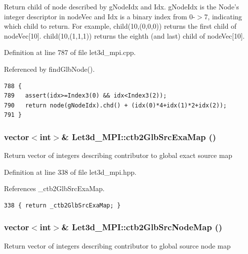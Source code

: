 Return child of node described by g\-Node\-Idx and Idx. g\-Node\-Idx is the Node's integer descriptor in node\-Vec and Idx is a binary index from 0-$>$7, indicating which child to return. For example, child(10,(0,0,0)) returns the first child of node\-Vec[10]. child(10,(1,1,1)) returns the eighth (and last) child of node\-Vec[10]. 

Definition at line 787 of file let3d\_\-mpi.cpp.

Referenced by find\-Glb\-Node().

\footnotesize\begin{verbatim}788 {
789   assert(idx>=Index3(0) && idx<Index3(2));
790   return node(gNodeIdx).chd() + (idx(0)*4+idx(1)*2+idx(2));
791 }
\end{verbatim}\normalsize 


\subsubsection{\setlength{\rightskip}{0pt plus 5cm}vector$<$int$>$\& Let3d\_\-MPI::ctb2Glb\-Src\-Exa\-Map ()\hspace{0.3cm}{\tt  [inline]}}\label{classLet3d__MPI_fa7b61748f05b09067f1fc99b672099e_fa7b61748f05b09067f1fc99b672099e}


Return vector of integers describing contributor to global exact source map 

Definition at line 338 of file let3d\_\-mpi.hpp.

References \_\-ctb2Glb\-Src\-Exa\-Map.

\footnotesize\begin{verbatim}338 { return _ctb2GlbSrcExaMap; }
\end{verbatim}\normalsize 


\subsubsection{\setlength{\rightskip}{0pt plus 5cm}vector$<$int$>$\& Let3d\_\-MPI::ctb2Glb\-Src\-Node\-Map ()\hspace{0.3cm}{\tt  [inline]}}\label{classLet3d__MPI_2edf7ec1048f348ac03b27bc90b9d2a0_2edf7ec1048f348ac03b27bc90b9d2a0}


Return vector of integers describing contributor to global source node map 

